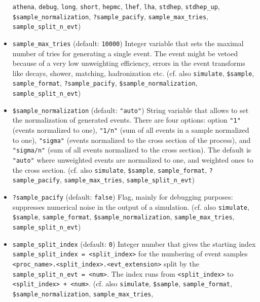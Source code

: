\documentclass[12pt]{book}
\newcommand{\ttt}[1]{\texttt{#1}}
\begin{document}
\begin{itemize}
\ttt{athena}, \ttt{debug}, \ttt{long}, \ttt{short}, \ttt{hepmc}, 
\ttt{lhef}, \ttt{lha}, \ttt{stdhep}, \ttt{stdhep\_up}, \newline
\ttt{\$sample\_normalization}, \ttt{?sample\_pacify},
\ttt{sample\_max\_tries}, \ttt{sample\_split\_n\_evt}) 
\item
\ttt{sample\_max\_tries} \qquad (default: \ttt{10000}) \newline
Integer variable that sets the maximal number of tries for generating
a single event. The event might be vetoed because of a very low
unweighting efficiency, errors in the event transforms like decays,
shower, matching, hadronization etc. (cf. also
\ttt{simulate}, \ttt{\$sample}, \ttt{sample\_format},
\ttt{?sample\_pacify}, \ttt{\$sample\_normalization}, \ttt{sample\_split\_n\_evt}) 
\item
\ttt{\$sample\_normalization} \qquad (default: \ttt{"auto"}) \newline
String variable that allows to set the normalization of generated
events. There are four options: option \ttt{"1"} (events normalized to
one), \ttt{"1/n"} (sum of all events in a sample normalized to one), 
\ttt{"sigma"} (events normalized to the cross section of the process),
and \ttt{"sigma/n"} (sum of all events normalized to the cross
section). The default is \ttt{"auto"} where unweighted events are
normalized to one, and weighted ones to the cross section. (cf. also
\ttt{simulate}, \ttt{\$sample}, \ttt{sample\_format},
\ttt{?sample\_pacify}, \ttt{sample\_max\_tries}, \ttt{sample\_split\_n\_evt}) 
\item
\ttt{?sample\_pacify} \qquad (default: \ttt{false}) \newline
Flag, mainly for debugging purposes: suppresses numerical noise in the
output of a simulation. (cf. also \ttt{simulate}, \ttt{\$sample},
\ttt{sample\_format}, \ttt{\$sample\_normalization},
\ttt{sample\_max\_tries}, \ttt{sample\_split\_n\_evt})
\item
\ttt{sample\_split\_index} \qquad (default: \ttt{0}) \newline
Integer number that gives the starting index \ttt{sample\_split\_index
= <split\_index>} for the numbering of event samples
\ttt{<proc\_name>.<split\_index>.<evt\_extension>} split by the 
\ttt{sample\_split\_n\_evt = <num>}. The index runs from
\ttt{<split\_index>} to \ttt{<split\_index> + <num>}. (cf. also
\ttt{simulate}, \ttt{\$sample}, \ttt{sample\_format},
\ttt{\$sample\_normalization}, \newline \ttt{sample\_max\_tries},

\end{itemize}
\end{document}

